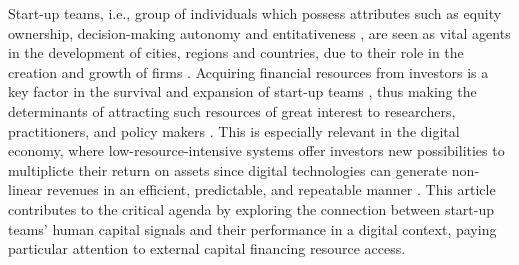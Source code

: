 \documentclass[12pt]{article}
\begin{document}
Start-up teams, i.e., group of individuals which possess attributes such as equity ownership, decision-making autonomy and entitativeness \citep{knight2020start}, are seen as vital agents in the development of cities, regions and countries, due to their role in the creation and growth of firms \citep{audretsch2001linking, autio2016entrepreneurship}. Acquiring financial resources from investors is a key factor in the survival and expansion of start-up teams \citep{rosenbusch2013does}, thus making the determinants of attracting such resources of great interest to researchers, practitioners, and policy makers \citep{EUcommission2015digital}. This is especially relevant in the digital economy, where low-resource-intensive systems offer investors new possibilities to multiplicte their return on assets since digital technologies can generate non-linear revenues in an efficient, predictable, and repeatable manner \citep{nambisan2017digital, sahut2021age}. This article contributes to the critical agenda by exploring the connection between start-up teams' human capital signals and their performance in a digital context, paying particular attention to external capital financing resource access.
\end{document}
